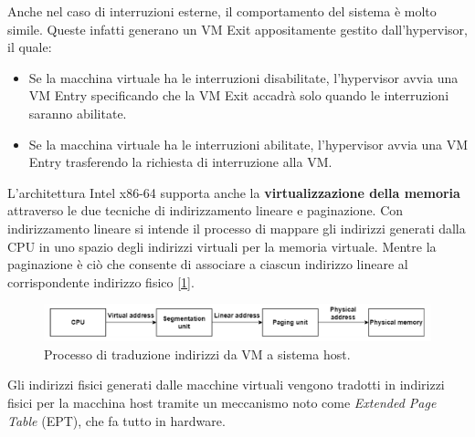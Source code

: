 Anche nel caso di interruzioni esterne, il comportamento del sistema è molto simile. Queste infatti generano un VM Exit appositamente gestito dall'hypervisor, il quale:
\begin{itemize}
    \item Se la macchina virtuale ha le interruzioni disabilitate, l'hypervisor avvia una VM Entry specificando che la VM Exit accadrà solo quando le interruzioni saranno abilitate.
    \item Se la macchina virtuale ha le interruzioni abilitate, l'hypervisor avvia una VM Entry trasferendo la richiesta di interruzione alla VM.
\end{itemize}
L'architettura Intel x86-64 supporta anche la \textbf{virtualizzazione della memoria} attraverso le due tecniche di indirizzamento lineare e paginazione. Con indirizzamento lineare si intende il processo di mappare gli indirizzi generati dalla CPU in uno spazio degli indirizzi virtuali per la memoria virtuale. Mentre la paginazione è ciò che consente di associare a ciascun indirizzo lineare al corrispondente indirizzo fisico [\ref{fig:virtual-mem}].
\begin{figure}[!h]
	\centering
	\includegraphics[width=0.8\linewidth]{img/virtual-mem}
	\caption{Processo di traduzione indirizzi da VM a sistema host.}
	\label{fig:virtual-mem}
\end{figure}
Gli indirizzi fisici generati dalle macchine virtuali vengono tradotti in indirizzi fisici per la macchina host tramite un meccanismo noto come \textit{Extended Page Table} (EPT), che fa tutto in hardware.